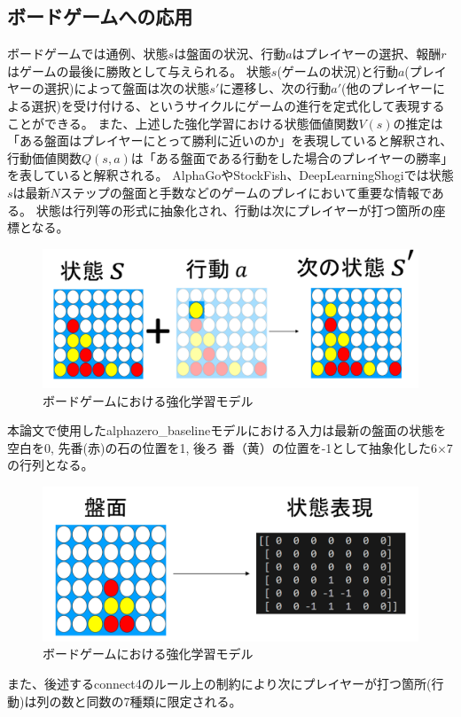 \subsection{ボードゲームへの応用}
ボードゲームでは通例、状態$s$は盤面の状況、行動$a$はプレイヤーの選択、報酬$r$はゲームの最後に勝敗として与えられる。
状態$s$(ゲームの状況)と行動$a$(プレイヤーの選択)によって盤面は次の状態$s'$に遷移し、次の行動$a'$(他のプレイヤーによる選択)を受け付ける、というサイクルにゲームの進行を定式化して表現することができる。
また、上述した強化学習における状態価値関数$V(s)$の推定は「ある盤面はプレイヤーにとって勝利に近いのか」を表現していると解釈され、行動価値関数$Q(s, a)$は「ある盤面である行動をした場合のプレイヤーの勝率」を表していると解釈される。
AlphaGo\cite{AlphaGo}やStockFish\cite{StockFish}、DeepLearningShogi\cite{dlshogi}では状態$s$は最新$N$ステップの盤面と手数などのゲームのプレイにおいて重要な情報である。
状態は行列等の形式に抽象化され、行動は次にプレイヤーが打つ箇所の座標となる。
\begin{figure}[t]
	\centering
	\includegraphics[width=\linewidth]{./figure/transition.png}
	\caption{ボードゲームにおける強化学習モデル}
	\label{fig:board-game-model}
\end{figure}

本論文で使用したalphazero\_baselineモデル\cite{baseline}における入力は最新の盤面の状態を空白を0, 先番(赤)の石の位置を1, 後ろ
番（黄）の位置を-1として抽象化した6$\times$7の行列となる。
\begin{figure}[t]
	\centering
	\includegraphics[width=\linewidth]{./figure/symbolic.png}
	\caption{ボードゲームにおける強化学習モデル}
	\label{fig:connect4-symbol}
\end{figure}
また、後述するconnect4のルール上の制約により次にプレイヤーが打つ箇所(行動)は列の数と同数の7種類に限定される。

